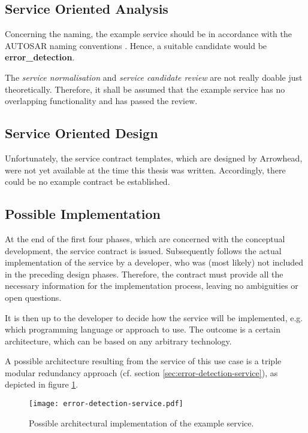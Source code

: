 \subsection{Service Oriented Analysis}


Concerning the naming, the example service should be in accordance with the \mbox{AUTOSAR} naming conventions \cite{autosar_system_modelling}. Hence, a suitable candidate would be \textbf{error\_detection}.

The \emph{service normalisation} and \emph{service candidate review} are not really doable just theoretically. Therefore, it shall be assumed that the example service has no overlapping functionality and has passed the review.





\subsection{Service Oriented Design}

Unfortunately, the service contract templates, which are designed by Arrowhead, were not yet available at the time this thesis was written. Accordingly, there could be no example contract be established.


\subsection{Possible Implementation}

At the end of the first four phases, which are concerned with the conceptual development, the service contract is issued. Subsequently follows the actual implementation of the service by a developer, who was (most likely) not included in the preceding design phases. Therefore, the contract must provide all the necessary information for the implementation process, leaving no ambiguities or open questions.

It is then up to the developer to decide how the service will be implemented, e.g. which programming language or approach to use. The outcome is a certain architecture, which can be based on any arbitrary technology. 

A possible architecture resulting from the service of this use case is a triple modular redundancy approach (cf. section \ref{sec:error-detection-service}), as depicted in figure \ref{fig:example-service-architecture}. 


\begin{figure}[ht]
\centering
\texttt{[image: error-detection-service.pdf]}
\caption{Possible architectural implementation of the example service.}
\label{fig:example-service-architecture}
\end{figure}
